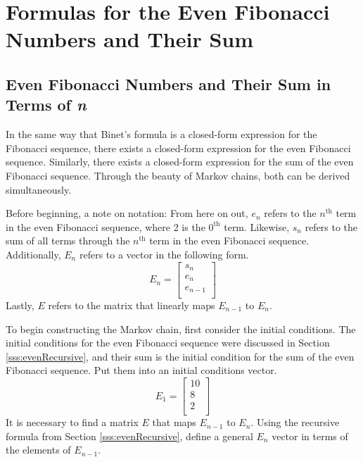 \documentclass[titlepage]{article}
\begin{document}
\section{Formulas for the Even Fibonacci Numbers and Their Sum}
\subsection{Even Fibonacci Numbers and Their Sum in Terms of \emph{n}}
In the same way that Binet's formula is a closed-form expression for the Fibonacci sequence, there exists a closed-form expression for the even Fibonacci sequence. Similarly, there exists a closed-form expression for the sum of the even Fibonacci sequence. Through the beauty of Markov chains, both can be derived simultaneously.\par
Before beginning, a note on notation: From here on out, $e_n$ refers to the $n^\text{th}$ term in the even Fibonacci sequence, where 2 is the $0^\text{th}$ term. Likewise, $s_n$ refers to the sum of all terms through the $n^\text{th}$ term in the even Fibonacci sequence. Additionally, $E_n$ refers to a vector in the following form.
\begin{equation*}
    E_n =
    \begin{bmatrix}
        s_n\\
        e_n\\
        e_{n-1}\\
    \end{bmatrix}
\end{equation*}
Lastly, $E$ refers to the matrix that linearly maps $E_{n-1}$ to $E_n$.\par
To begin constructing the Markov chain, first consider the initial conditions. The initial conditions for the even Fibonacci sequence were discussed in Section \ref{sss:evenRecursive}, and their sum is the initial condition for the sum of the even Fibonacci sequence. Put them into an initial conditions vector.
\begin{equation*}
    E_1 =
    \begin{bmatrix}
        10\\
        8\\
        2\\
    \end{bmatrix}
\end{equation*}
It is necessary to find a matrix $E$ that maps $E_{n-1}$ to $E_n$. Using the recursive formula from Section \ref{sss:evenRecursive}, define a general $E_n$ vector in terms of the elements of $E_{n-1}$.
\end{document}
